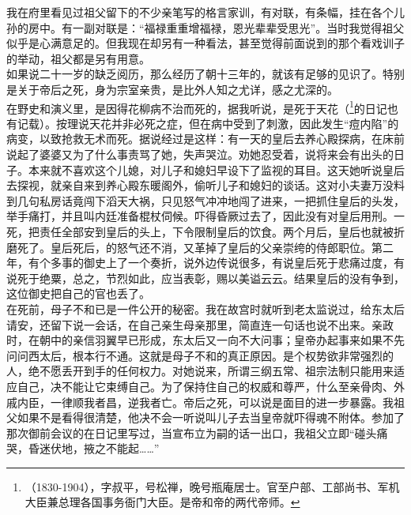   我在府里看见过祖父留下的不少亲笔写的格言家训，有对联，有条幅，挂在各个儿孙的房中。有一副对联是：“福禄重重增福禄，恩光辈辈受思光”。当时我觉得祖父似乎是心满意足的。但我现在却另有一种看法，甚至觉得前面说到的那个看戏训子的举动，祖父都是另有用意。\\

  如果说二十一岁的缺乏阅历，那么经历了朝十三年的，就该有足够的见识了。特别是关于帝后之死，身为宗室亲贵，是比外人知之尤详，感之尤深的。\\

  在野史和演义里，是因得花柳病不治而死的，据我听说，是死于天花（\footnote{（1830-1904），字叔平，号松禅，晚号瓶庵居士。官至户部、工部尚书、军机大臣兼总理各国事务衙门大臣。是帝和帝的两代帝师。}的日记也有记载）。按理说天花并非必死之症，但在病中受到了刺激，因此发生“痘内陷”的病变，以致抢救无术而死。据说经过是这样：有一天的皇后去养心殿探病，在床前说起了婆婆又为了什么事责骂了她，失声哭泣。劝她忍受着，说将来会有出头的日子。本来就不喜欢这个儿媳，对儿子和媳妇早设下了监视的耳目。这天她听说皇后去探视，就亲自来到养心殿东暖阁外，偷听儿子和媳妇的谈话。这对小夫妻万没料到几句私房话竟闯下滔天大祸，只见怒气冲冲地闯了进来，一把抓住皇后的头发，举手痛打，并且叫内廷准备棍杖伺候。吓得昏厥过去了，因此没有对皇后用刑。一死，把责任全部安到皇后的头上，下令限制皇后的饮食。两个月后，皇后也就被折磨死了。皇后死后，的怒气还不消，又革掉了皇后的父亲崇绔的侍郎职位。第二年，有个多事的御史上了一个奏折，说外边传说很多，有说皇后死于悲痛过度，有说死于绝粟，总之，节烈如此，应当表彰，赐以美谥云云。结果皇后的没有争到，这位御史把自己的官也丢了。\\

  在死前，母子不和已是一件公开的秘密。我在故宫时就听到老太监说过，给东太后请安，还留下说一会话，在自己亲生母亲那里，简直连一句话也说不出来。亲政时，在朝中的亲信羽翼早已形成，东太后又一向不大问事；皇帝办起事来如果不先问问西太后，根本行不通。这就是母子不和的真正原因。是个权势欲非常强烈的人，绝不愿丢开到手的任何权力。对她说来，所谓三纲五常、祖宗法制只能用来适应自己，决不能让它束缚自己。为了保持住自己的权威和尊严，什么至亲骨肉、外戚内臣，一律顺我者昌，逆我者亡。帝后之死，可以说是面目的进一步暴露。我祖父如果不是看得很清楚，他决不会一听说叫儿子去当皇帝就吓得魂不附体。参加了那次御前会议的在日记里写过，当宣布立为嗣的话一出口，我祖父立即“碰头痛哭，昏迷伏地，掖之不能起……”\\

